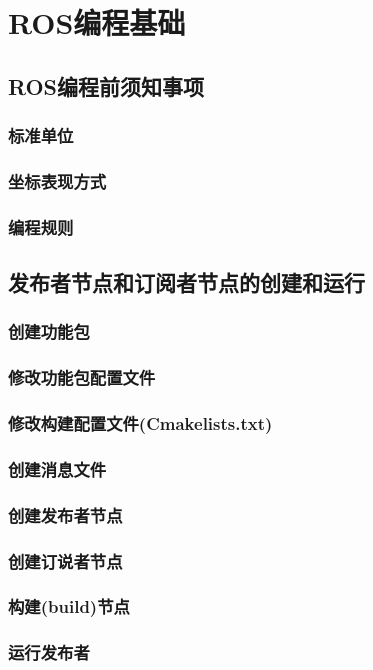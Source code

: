 \documentclass[geye,green,kindle,cn]{elegantnote}
\begin{document}
\section{ROS编程基础}
\subsection{ROS编程前须知事项}
\subsubsection{标准单位}
\subsubsection{坐标表现方式}
\subsubsection{编程规则}
\subsection{发布者节点和订阅者节点的创建和运行}
\subsubsection{创建功能包}
\subsubsection{修改功能包配置文件}
\subsubsection{修改构建配置文件(Cmakelists.txt)}
\subsubsection{创建消息文件}
\subsubsection{创建发布者节点}
\subsubsection{创建订说者节点}
\subsubsection{构建(build)节点}
\subsubsection{运行发布者}
\end{document}
